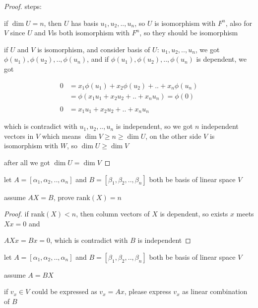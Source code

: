 \begin{proof}
    steps:

    if $\dim U = n$, then $U$ has basis $u_1,u_2,..,u_n$, so $U$ is isomorphism with $F^n$, also for $V$
    since $U$ and $V$is both isomorphism with $F^n$, so they should be isomorphism

    if $U$ and $V$ is isomorphism, and consider basis of $U$: $u_1, u_2, .., u_n$, we got
    $\phi(u_1), \phi(u_2), .. , \phi(u_n)$, and if $\phi(u_1), \phi(u_2), ..,\phi(u_n)$ is dependent, we got

    \begin{align*}
        0 &= x_1\phi(u_1) + x_2\phi(u_2) + .. + x_n \phi(u_n) \\
        &= \phi(x_1u_1 + x_2u_2 + .. + x_nu_n) = \phi(0) \\
        \\
        0 & = x_1u_1+x_2u_2 + .. + x_n u_n 
    \end{align*}

    which is contradict with $u_1,u_2,..,u_n$ is independent, so we got $n$ independent vectors in $V$ which means
    $\dim V \ge n \ge \dim U$, on the other side $V$ is isomorphism with $W$, so
    $\dim U \ge \dim V$

    after all we got $\dim U = \dim V$
\end{proof}

\begin{exercise}
    let $A=[\alpha_1,\alpha_2,..,\alpha_n]$ and $B=[\beta_1,\beta_2,..,\beta_n]$ both 
    be basis of linear space $V$

    assume $AX = B$, prove $\mathrm{rank}(X) = n$
\end{exercise}

\begin{proof}
   if $\mathrm{rank}(X) < n$, then column vectors of $X$ is dependent, so exists $x$ meets $Xx = 0$ and 

   $AXx = Bx = 0$, which is contradict with $B$ is independent
\end{proof}

\begin{exercise}
    let $A=[\alpha_1,\alpha_2,..,\alpha_n]$ and $B=[\beta_1,\beta_2,..,\beta_n]$ both 
    be basis of linear space $V$

    assume $A = BX$

    if $v_x \in V$ could be expressed as $v_x = Ax$, please express $v_x$ as linear combination of $B$
\end{exercise}

